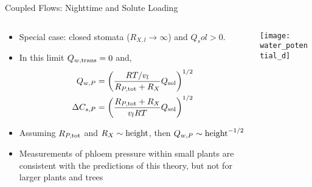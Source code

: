 \documentclass[10pt]{beamer}
\newcommand{\tn}{\textnormal}
\begin{document}
\begin{frame}{Coupled Flows: Nighttime and Solute Loading}
  \begin{columns}
    \begin{column}{.69\textwidth}
      \begin{itemize}
      \item Special case: closed stomata ($R_{X, l} \rightarrow
        \infty$) and $Q_sol > 0$.
      \item In this limit $Q_{w, \tn{trans}} = 0$ and,
        \begin{align*}
          Q_{w, P} = \left( \frac{RT / v_l}{R_{P, \tn{tot}} + R_X}
          Q_\tn{sol} \right)^{1/2} \\
          \Delta C_{s, P} = \left(\frac{R_{P, \tn{tot}} + R_X}{v_l RT}
          Q_\tn{sol} \right)^{1/2}
        \end{align*}
      \item Assuming $R_{P, \tn{tot}}$ and $R_X \sim \tn{height}$,
        then $Q_{w, P} \sim \tn{height}^{-1/2}$
      \item Measurements of phloem pressure within small plants are
        consistent with the predictions of this theory, but not for
        larger plants and trees
      \end{itemize}
    \end{column}
    \begin{column}{.29\textwidth}
      \vfill
      \texttt{[image: water\_potential\_d]}
      \vfill
    \end{column}
  \end{columns}
\end{frame}
\end{document}
